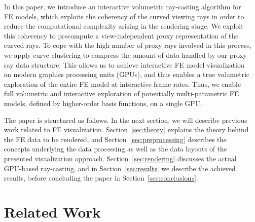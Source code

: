 \documentclass[review,journal]{vgtc}         %
\begin{document}
In this paper, we introduce an interactive volumetric ray-casting algorithm for FE models, which exploits the coherency of the curved viewing rays in order to reduce the computational complexity arising in the rendering stage. We exploit this coherency to precompute a view-independent proxy representation of the curved rays. To cope with the high number of proxy rays involved in this process, we apply curve clustering to compress the amount of data handled by our proxy ray data structure. This allows us to achieve interactive FE model visualization on modern graphics processing units (GPUs), and thus enables a true volumetric exploration of the entire FE model at interactive frame rates. Thus, we enable full volumetric and interactive exploration of potentially multi-parametric FE models, defined by higher-order basis functions, on a single GPU.

The paper is structured as follows. In the next section, we will describe previous work related to FE visualization. Section~\ref{sec:theory} explains the theory behind the FE data to be rendered, and Section~\ref{sec:preprocessing} describes the concepts underlying the data processing as well as the data layouts of the presented visualization approach. Section~\ref{sec:rendering} discusses the actual GPU-based ray-casting, and in Section~\ref{sec:results} we describe the achieved results, before concluding the paper in Section~\ref{sec:conclusions}.



\section{Related Work}\label{sec:relatedwork}
\end{document}
